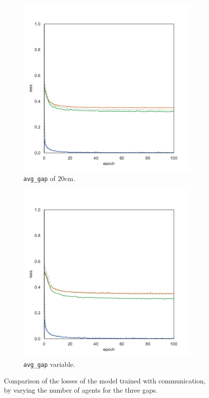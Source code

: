 \begin{figure}[!htb]
\begin{center}
\begin{subfigure}[h]{0.32\textwidth}
			\includegraphics[width=\textwidth]{contents/images/task2/loss-communication-gap_20}%
			\caption{\texttt{avg\_gap} of $20$\gls{cm}.}
		\end{subfigure}
		\hfill
		\begin{subfigure}[h]{0.32\textwidth}
			\includegraphics[width=\textwidth]{contents/images/task2/loss-communication-gap_var}
			\caption{\texttt{avg\_gap} variable.}
		\end{subfigure}
	\end{center}
	\vspace{-0.5cm}
	\caption[Losses summary of the second task 
	(communication).]{Comparison of 
	the losses of the model trained with communication, by varying the 
	number of 
	agents for the three gaps.}
	\label{fig:commlosst2}
\end{figure}

